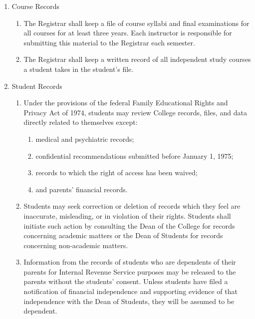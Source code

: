 \documentclass{manual}
\newcommand{\modified}[1]{}
\newcommand{\oldbreak}[1]{}
\newcommand{\itemLevelA}{\alph*.}
\newcommand{\itemLevelB}{\arabic*)}
\newcommand{\itemRefA}{\alph*}
\newcommand{\itemRefB}{\arabic*}
\begin{document}
\begin{enumerate}[label=\itemLevelA,ref=\itemRefA]
\item Course Records

\begin{enumerate}[label=\itemLevelB,ref=\itemRefB]

\item The Registrar shall keep a file of course syllabi  and final examinations for all courses for at least three years. Each instructor is responsible for submitting this material to the Registrar each semester.

\item The Registrar\modified{5/12/98}  shall keep a written record of all independent study courses a student takes in the student's file.

\end{enumerate}
\oldbreak{VII-7}

\item Student Records

\begin{enumerate}[label=\itemLevelB,ref=\itemRefB]

\item Under the provisions of the federal Family Educational Rights and Privacy Act of 1974, students may review College records, files, and data directly related to themselves except: 

\begin{enumerate}[label=\alph*)]

\item medical and psychiatric records; 

\item confidential recommendations submitted before January 1, 1975;

\item records to which the right of access has been waived; 

\item and parents' financial records.
\end{enumerate}

\item Students may seek correction or deletion of records which they feel are inaccurate, misleading, or in violation of their rights. Students shall initiate such action by consulting the Dean of the College for records concerning academic matters or the Dean of Students for records concerning non-academic matters.

\item Information from the records of students who are dependents of their parents for Internal Revenue Service purposes may be released to the parents without the students' consent. Unless students have filed a notification of financial independence and supporting evidence of that independence with the Dean of Students, they will be assumed to be dependent.


\end{enumerate}
\end{enumerate}
\end{document}
